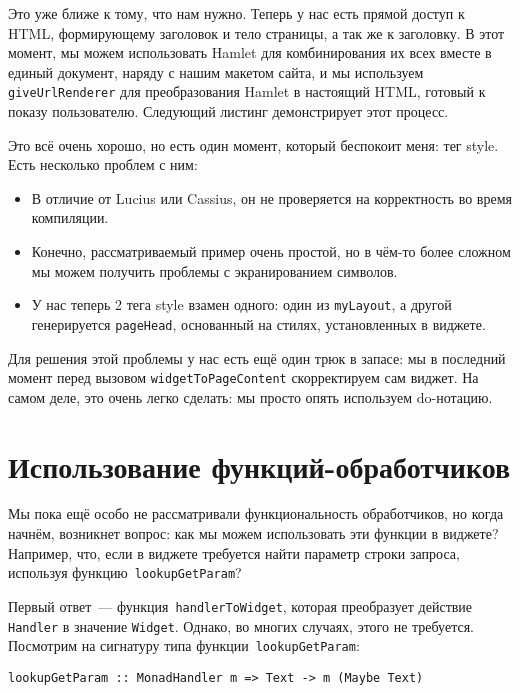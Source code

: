 Это уже ближе к тому, что нам нужно. Теперь у нас есть прямой доступ к HTML,
формирующему заголовок и тело страницы, а так же к заголовку. В этот момент, мы
можем использовать Hamlet для комбинирования их всех вместе в единый документ,
наряду с нашим макетом сайта, и мы используем \lstinline'giveUrlRenderer' для
преобразования Hamlet в настоящий HTML, готовый к показу пользователю.
Следующий листинг демонстрирует этот процесс.

Это всё очень хорошо, но есть один момент, который беспокоит меня: тег style.
Есть несколько проблем с ним:
\begin{itemize}
    \item В отличие от Lucius или Cassius, он не проверяется на корректность во
        время компиляции.

    \item Конечно, рассматриваемый пример очень простой, но в чём-то более
        сложном мы можем получить проблемы с экранированием символов.

    \item У нас теперь 2 тега style взамен одного: один из
        \lstinline'myLayout', а другой генерируется \lstinline'pageHead',
        основанный на стилях, установленных в виджете.
\end{itemize}

Для решения этой проблемы у нас есть ещё один трюк в запасе: мы в последний
момент перед вызовом \lstinline'widgetToPageContent' скорректируем сам виджет.
На самом деле, это очень легко сделать: мы просто опять используем do-нотацию.

\section{Использование функций-обработчиков}
Мы пока ещё особо не рассматривали функциональность обработчиков, но когда
начнём, возникнет вопрос: как мы можем использовать эти функции в виджете?
Например, что, если в виджете требуется найти параметр строки запроса,
используя функцию~\lstinline'lookupGetParam'?

Первый ответ~--- функция~\lstinline'handlerToWidget', которая преобразует
действие \lstinline'Handler' в значение \lstinline'Widget'. Однако, во многих
случаях, этого не требуется. Посмотрим на сигнатуру типа
функции~\lstinline'lookupGetParam':
\begin{lstlisting}
lookupGetParam :: MonadHandler m => Text -> m (Maybe Text)
\end{lstlisting}

